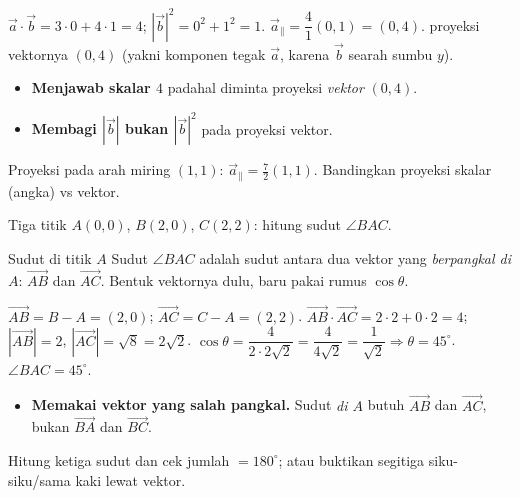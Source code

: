 \jawab
{} $\vec a\cdot\vec b=3\cdot0+4\cdot1=4$; $|\vec b|^2=0^2+1^2=1$.
 $\vec a_\parallel=\dfrac{4}{1}(0,1)=(0,4)$.
\jadi proyeksi vektornya $(0,4)$ (yakni komponen tegak $\vec a$, karena $\vec b$
searah sumbu $y$).

\begin{jebakan}
\begin{itemize}[leftmargin=*,topsep=2pt]
  \item \textbf{Menjawab skalar $4$} padahal diminta proyeksi \emph{vektor}
  $(0,4)$.
  \item \textbf{Membagi $|\vec b|$ bukan $|\vec b|^2$} pada proyeksi vektor.
\end{itemize}
\end{jebakan}

\begin{variasi}
Proyeksi pada arah miring $(1,1)$: $\vec a_\parallel=\frac{7}{2}(1,1)$. Bandingkan
proyeksi skalar (angka) vs vektor.
\end{variasi}

\begin{soalbox}{}
Tiga titik $A(0,0)$, $B(2,0)$, $C(2,2)$: hitung sudut $\angle BAC$.
\end{soalbox}

\begin{ingat}{Sudut di titik $A$}
Sudut $\angle BAC$ adalah sudut antara dua vektor yang \emph{berpangkal di $A$}:
$\vec{AB}$ dan $\vec{AC}$. Bentuk vektornya dulu, baru pakai rumus $\cos\theta$.
\end{ingat}

\jawab
{} $\vec{AB}=B-A=(2,0)$; $\vec{AC}=C-A=(2,2)$.
 $\vec{AB}\cdot\vec{AC}=2\cdot2+0\cdot2=4$; $|\vec{AB}|=2$,
$|\vec{AC}|=\sqrt{8}=2\sqrt2$.
 $\cos\theta=\dfrac{4}{2\cdot2\sqrt2}=\dfrac{4}{4\sqrt2}
=\dfrac{1}{\sqrt2}\Rightarrow\theta=45^\circ$.
\jadi $\angle BAC=45^\circ$.

\begin{jebakan}
\begin{itemize}[leftmargin=*,topsep=2pt]
  \item \textbf{Memakai vektor yang salah pangkal.} Sudut \emph{di $A$} butuh
  $\vec{AB}$ dan $\vec{AC}$, bukan $\vec{BA}$ dan $\vec{BC}$.
\end{itemize}
\end{jebakan}

\begin{variasi}
Hitung ketiga sudut dan cek jumlah $=180^\circ$; atau buktikan segitiga
siku-siku/sama kaki lewat vektor.
\end{variasi}

